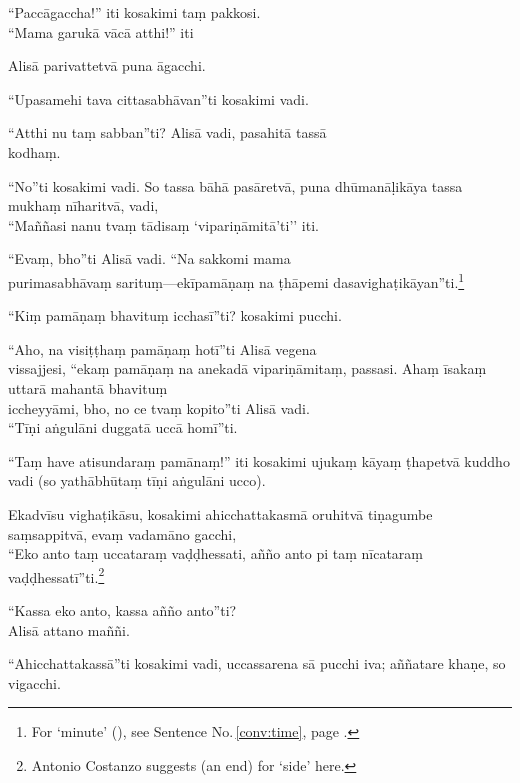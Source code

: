 \begin{answerkey}
\item ``Pacc\=agaccha!'' iti kosakimi ta\d m pakkosi. \\``Mama garuk\=a v\=ac\=a atthi!'' iti
\item Alis\=a parivattetv\=a puna \=agacchi.
\item ``Upasamehi tava cittasabh\=avan''ti kosakimi vadi.
\item ``Atthi nu ta\d m sabban''ti? Alis\=a vadi, pasahit\=a tass\=a \\kodha\d m.
\item ``No''ti kosakimi vadi. So tassa b\=ah\=a pas\=aretv\=a, puna dh\=uman\=a\d lik\=aya tassa mukha\d m n\=iharitv\=a, vadi, \\``Ma\~n\~nasi nanu tva\d m t\=adisa\d m `vipari\d n\=amit\=a'ti'' iti.
\item ``Eva\d m, bho''ti Alis\=a vadi. ``Na sakkomi mama \\purimasabh\=ava\d m saritu\d m---ek\=ipam\=a\d na\d m na \d th\=apemi dasavigha\d tik\=ayan''ti.\footnote{For `minute' (), see Sentence No.\,\ref{conv:time}, page \pageref{conv:time}.}
\item ``Ki\d m pam\=a\d na\d m bhavitu\d m icchas\=i''ti? kosakimi pucchi.
\item ``Aho, na visi\d t\d tha\d m pam\=a\d na\d m hot\=i''ti Alis\=a vegena \\vissajjesi, ``eka\d m pam\=a\d na\d m na anekad\=a vipari\d n\=amita\d m, passasi. Aha\d m \=isaka\d m uttar\=a mahant\=a bhavitu\d m \\iccheyy\=ami, bho, no ce tva\d m kopito''ti Alis\=a vadi. \\``T\=i\d ni a\.ngul\=ani duggat\=a ucc\=a hom\=i''ti.
\item ``Ta\d m have atisundara\d m pam\=ana\d m!'' iti kosakimi ujuka\d m k\=aya\d m \d thapetv\=a kuddho vadi (so yath\=abh\=uta\d m t\=i\d ni a\.ngul\=ani ucco).
\item Ekadv\=isu vigha\d tik\=asu, kosakimi ahicchattakasm\=a oruhitv\=a ti\d nagumbe sa\d msappitv\=a, eva\d m vadam\=ano gacchi, \\``Eko anto ta\d m uccatara\d m va\d d\d dhessati, a\~n\~no anto pi ta\d m n\=icatara\d m va\d d\d dhessat\=i''ti.\footnote{Antonio Costanzo suggests  (an end) for `side' here.}
\item ``Kassa eko anto, kassa a\~n\~no anto''ti? \\Alis\=a attano ma\~n\~ni.
\item ``Ahicchattakass\=a''ti kosakimi vadi, uccassarena s\=a pucchi iva; a\~n\~natare kha\d ne, so vigacchi.
\end{answerkey}
